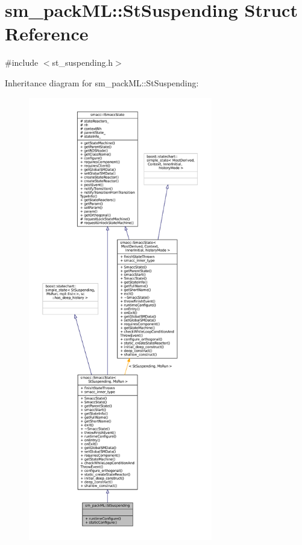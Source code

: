\hypertarget{structsm__packML_1_1StSuspending}{}\section{sm\+\_\+pack\+ML\+:\+:St\+Suspending Struct Reference}
\label{structsm__packML_1_1StSuspending}


{\ttfamily \#include $<$st\+\_\+suspending.\+h$>$}



Inheritance diagram for sm\+\_\+pack\+ML\+:\+:St\+Suspending\+:
\nopagebreak
\begin{figure}[H]
\begin{center}
\leavevmode
\includegraphics[height=550pt]{structsm__packML_1_1StSuspending__inherit__graph}
\end{center}
\end{figure}


